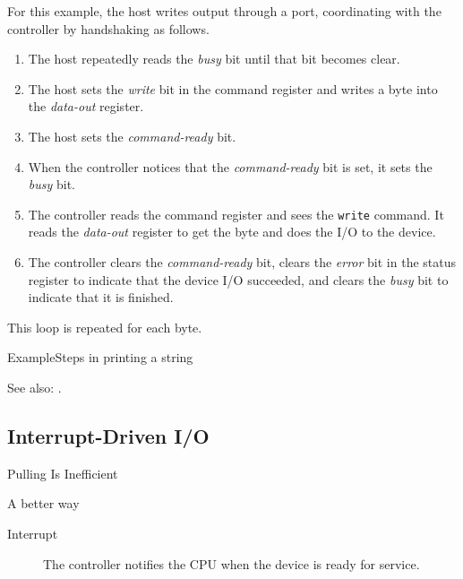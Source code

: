 For this example, the host writes output through a port, coordinating with the controller
by handshaking as follows.
\begin{enumerate}
\item The host repeatedly reads the \emph{busy} bit until that bit becomes clear.
\item The host sets the \emph{write} bit in the command register and writes a byte into
  the \emph{data-out} register.
\item The host sets the \emph{command-ready} bit.
\item When the controller notices that the \emph{command-ready} bit is set, it sets the
  \emph{busy} bit.
\item The controller reads the command register and sees the \texttt{write} command.  It
  reads the \emph{data-out} register to get the byte and does the I/O to the device.
\item The controller clears the \emph{command-ready} bit, clears the \emph{error} bit in
  the status register to indicate that the device I/O succeeded, and clears the
  \emph{busy} bit to indicate that it is ﬁnished.
\end{enumerate}
This loop is repeated for each byte.

\begin{frame}{Example}{Steps in printing a string}
  \begin{center}
     
  \end{center}
  \begin{center}
     
  \end{center}
\end{frame}

See also: .

\subsection{Interrupt-Driven I/O}

\begin{frame}{Pulling Is Inefficient}
  \begin{block}{A better way}
    \begin{description}
    \item[Interrupt] The controller notifies the CPU when the device is ready for service.
    \end{description}
  \end{block}
  \begin{center}
     
  \end{center}
\end{frame}

